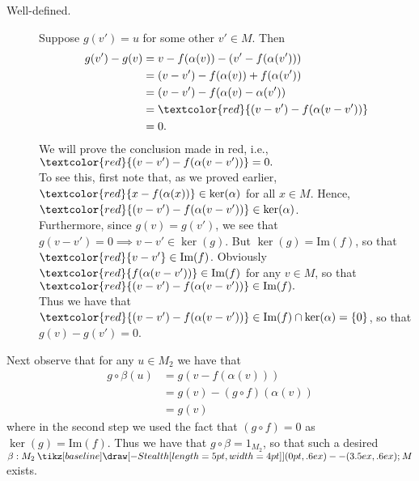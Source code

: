 \documentclass[12pt,letterpaper]{algebra_book}
\renewcommand{\to}{\mathbin{\tikz[baseline] \draw[-{Stealth[length=5pt,width=4pt]}] (0pt,.6ex) -- (3.5ex,.6ex);}}
\newcommand{\im}{\mbox{Im}}
\theoremstyle{definition}
\begin{document}
\begin{prf}
\begin{description}
        \begin{description}
            \item[Well-defined.] 
            Suppose $g(v') = u$ for some other $v' \in M$. Then
            \begin{align*}
                g(v') - g(v) &= v - f(\alpha(v)) - (v' - f(\alpha(v')))\\
                &= (v - v') - f(\alpha(v)) + f(\alpha(v'))\\
                &= (v - v') - f(\alpha(v) - \alpha(v'))\\
                &= \textcolor{red}{(v - v') - f(\alpha(v - v'))}\\
                &= 0.
            \end{align*}
            We will prove the conclusion made in red, i.e., 
            $\textcolor{red}{(v - v') - f(\alpha(v - v'))} = 0.$
            \\

            To see this, first note that, as we proved earlier, $\textcolor{red}{x
            - f(\alpha(x))} \in \ker(\alpha)$
            for all $x \in M$. Hence, $\textcolor{red}{(v - v') - f(\alpha(v - v'))}
            \in \ker(\alpha)$. 
            \\

            Furthermore,
            since $g(v) = g(v')$, we see that $g(v - v')
            = 0 \implies v - v' \in \ker(g)$. But $\ker(g) = \im(f)$,
            so that $\textcolor{red}{v - v'} \in \im(f)$.
            Obviously $\textcolor{red}{f(\alpha(v - v'))} \in
            \im(f)$ for any $v \in M$, so that 
            $\textcolor{red}{(v - v') - f(\alpha(v - v'))}
            \in \im(f).$
            \\

            Thus we have that $\textcolor{red}{(v - v') - f(\alpha(v - v'))} \in \im(f)
            \cap \ker(\alpha) = \{0\}$, so that $g(v) - g(v') =
            0$.  
        \end{description}
        Next observe that for any $u \in M_2$ we have that 
        \begin{align*}
            g \circ \beta (u) &= g(v - f(\alpha(v)))\\
            &= g(v) - (g \circ f)(\alpha(v))\\
            &= g(v)
        \end{align*}
        where in the second step we used the fact that $(g \circ
        f) = 0$ as $\ker(g) = \im(f)$. Thus we have that $g \circ
        \beta = 1_{M_2}$, so that such a desired $\beta: M_2 \to M$
        exists. 


\end{description}
\end{prf}
\end{document}

